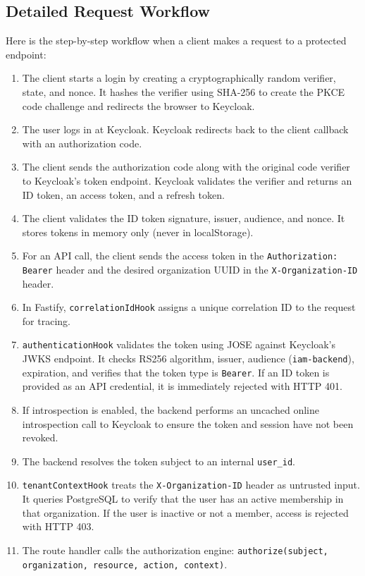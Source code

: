 \documentclass{article}
\begin{document}
\subsection*{Detailed Request Workflow}
Here is the step-by-step workflow when a client makes a request to a protected endpoint:
\begin{enumerate}
    \item The client starts a login by creating a cryptographically random verifier, state, and nonce. It hashes the verifier using SHA-256 to create the PKCE code challenge and redirects the browser to Keycloak.
    \item The user logs in at Keycloak. Keycloak redirects back to the client callback with an authorization code.
    \item The client sends the authorization code along with the original code verifier to Keycloak's token endpoint. Keycloak validates the verifier and returns an ID token, an access token, and a refresh token.
    \item The client validates the ID token signature, issuer, audience, and nonce. It stores tokens in memory only (never in localStorage).
    \item For an API call, the client sends the access token in the \texttt{Authorization: Bearer} header and the desired organization UUID in the \texttt{X-Organization-ID} header.
    \item In Fastify, \texttt{correlationIdHook} assigns a unique correlation ID to the request for tracing.
    \item \texttt{authenticationHook} validates the token using JOSE against Keycloak's JWKS endpoint. It checks RS256 algorithm, issuer, audience (\texttt{iam-backend}), expiration, and verifies that the token type is \texttt{Bearer}. If an ID token is provided as an API credential, it is immediately rejected with HTTP 401.
    \item If introspection is enabled, the backend performs an uncached online introspection call to Keycloak to ensure the token and session have not been revoked.
    \item The backend resolves the token subject to an internal \texttt{user\_id}.
    \item \texttt{tenantContextHook} treats the \texttt{X-Organization-ID} header as untrusted input. It queries PostgreSQL to verify that the user has an active membership in that organization. If the user is inactive or not a member, access is rejected with HTTP 403.
    \item The route handler calls the authorization engine: \texttt{authorize(subject, organization, resource, action, context)}.

\end{enumerate}
\end{document}
